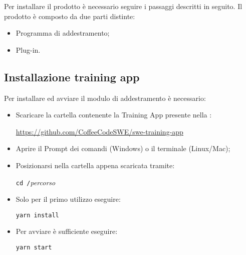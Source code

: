 \documentclass[../manuale-utente.tex]{subfiles}
\begin{document}
Per installare il prodotto è necessario seguire i passaggi descritti in seguito. Il prodotto è composto da due parti distinte:
\begin{itemize}
  \item Programma di addestramento;
  \item Plug-in.
\end{itemize}

\subsection{Installazione training app}
\label{subs:installazione-training-app}
Per installare ed avviare il modulo di addestramento è necessario:
\begin{itemize}
  \item Scaricare la cartella contenente la Training App presente nella : \\
  \centerline{\url{https://github.com/CoffeeCodeSWE/swe-training-app}}
  \item Aprire il Prompt dei comandi (Windows) o il terminale (Linux/Mac);
  \item Posizionarsi nella cartella appena scaricata tramite: \\
  \centerline{\texttt{cd /}\textit{percorso}}
  \item Solo per il primo utilizzo eseguire: \\
  \centerline{\texttt{yarn install}}
  \item Per avviare è sufficiente eseguire: \\
  \centerline{\texttt{yarn start}}
\end{itemize}
\end{document}
